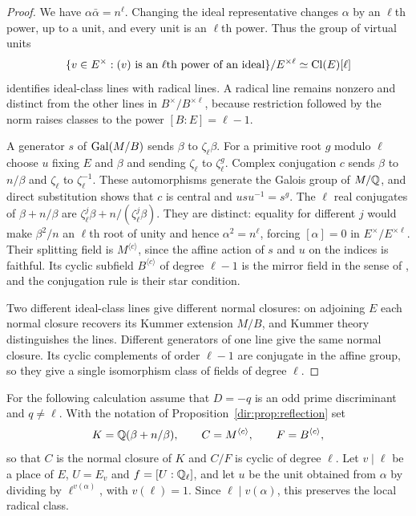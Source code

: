 \begin{proof}
We have $\alpha\bar\alpha=n^\ell$. Changing the ideal representative changes $\alpha$
by an $\ell$th power, up to a unit, and every unit is an $\ell$th power. Thus the
group of virtual units
\[
 \{v\in E^\times:(v)\text{ is an }\ell\text{th power of an ideal}\}/E^{\times\ell}
 \simeq\operatorname{Cl}(E)[\ell]
\]
identifies ideal-class lines with radical lines. A radical line remains nonzero and
distinct from the other lines in $B^\times/B^{\times\ell}$, because restriction
followed by the norm raises classes to the power $[B:E]=\ell-1$.

A generator $s$ of $\operatorname{Gal}(M/B)$ sends $\beta$ to $\zeta_\ell\beta$. For a primitive root
$g$ modulo $\ell$ choose $u$ fixing $E$ and $\beta$ and sending $\zeta_\ell$ to
$\zeta_\ell^g$. Complex conjugation $c$ sends $\beta$ to $n/\beta$ and $\zeta_\ell$ to
$\zeta_\ell^{-1}$. These automorphisms generate the Galois group of $M/\mathbb{Q}$, and direct
substitution shows that $c$ is central and $usu^{-1}=s^g$. The $\ell$ real conjugates
of $\beta+n/\beta$ are $\zeta_\ell^j\beta+n/(\zeta_\ell^j\beta)$. They are distinct:
equality for different $j$ would make $\beta^2/n$ an $\ell$th root of unity and hence
$\alpha^2=n^\ell$, forcing $[\alpha]=0$ in $E^\times/E^{\times\ell}$. Their splitting
field is $M^{\langle c\rangle}$, since the affine action of $s$ and $u$ on the indices
is faithful. Its cyclic subfield $B^{\langle c\rangle}$ of degree $\ell-1$ is the
mirror field in the sense of \cite{CohenRubinsteinSalzedoThorne2015Identities}, and
the conjugation rule is their star condition.

Two different ideal-class lines give different normal closures: on adjoining $E$ each
normal closure recovers its Kummer extension $M/B$, and Kummer theory distinguishes the
lines. Different generators of one line give the same normal closure. Its cyclic
complements of order $\ell-1$ are conjugate in the affine group, so they give a single
isomorphism class of fields of degree $\ell$.
\end{proof}

For the following calculation assume that $D=-q$ is an odd prime discriminant and
$q\ne\ell$. With the notation of Proposition~\ref{dir:prop:reflection} set
\[
 K=\mathbb{Q}(\beta+n/\beta),\qquad C=M^{\langle c\rangle},\qquad F=B^{\langle c\rangle},
\]
so that $C$ is the normal closure of $K$ and $C/F$ is cyclic of degree $\ell$. Let
$v\mid\ell$ be a place of $E$, $U=E_v$ and $f=[U:\mathbb{Q}_\ell]$, and let $u$ be the unit
obtained from $\alpha$ by dividing by $\ell^{v(\alpha)}$, with $v(\ell)=1$. Since
$\ell\mid v(\alpha)$, this preserves the local radical class.

